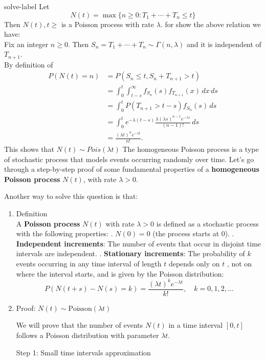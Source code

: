 \begin{solve}{}{solve-label}
		Let 
		$$N(t) = \max\{n\geq0:T_1 + \cdots + T_n \leq t\}$$
		Then {$N(t), t\geq $} is a Poisson process with rate $\lambda$.
		for show the above relation we have:\\
		Fix an integer $n\geq 0$. Then $S_n = T_1 + \cdots + T_n \sim \Gamma(n,\lambda) $ and it is independent of $T_{n+1}.$\\
		By definition of \begin{align*}
			P(N(t) = n) &= P(S_n \leq t, S_n + T_{n+1} > t) \\
			&= \int_0^t \int_{t-s}^{\infty} f_{S_n}(s) f_{T_{n+1}}(x) \, dx \, ds \\
			&= \int_0^t P(T_{n+1} > t - s) f_{S_n}(s) \, ds \\
			&= \int_0^t e^{-\lambda(t - s)} \frac{\lambda(\lambda s)^{n-1} e^{-\lambda s}}{(n-1)!} \, ds \\
			&= \frac{(\lambda t)^n e^{-\lambda t}}{n!}.
		\end{align*}
		This shows that $N(t) \sim Pois(\lambda t)$
		The homogeneous Poisson process is a type of stochastic process that models events occurring randomly over time. Let's go through a step-by-step proof of some fundamental properties of a \textbf{homogeneous Poisson process} $N(t)$, with rate $\lambda > 0$. \cite{LectureA}
		
		Another way to solve this question is that:
		\begin{enumerate}
			\item Definition\\
			A \textbf{Poisson process} $N(t)$ with rate $\lambda > 0$ is defined as a stochastic process with the following properties:
			. $N(0) = 0$ (the process starts at 0).
			. \textbf{Independent increments}: The number of events that occur in disjoint time intervals are independent.
			. \textbf{Stationary increments}: The probability of $k$ events occurring in any time interval of length \( t \) depends only on $t$ , not on where the interval starts, and is given by the Poisson distribution:
			$$P(N(t + s) - N(s) = k) = \frac{(\lambda t)^k e^{-\lambda t}}{k!}, \quad k = 0, 1, 2, \dots$$
			
			\item Proof: $N(t) \sim \text{Poisson}(\lambda t)$
			
			We will prove that the number of events $N(t)$ in a time interval $[0, t]$ follows a Poisson distribution with parameter $\lambda t$.
			
			\subitem Step 1: Small time intervals approximation
			

\end{enumerate}
\end{solve}
